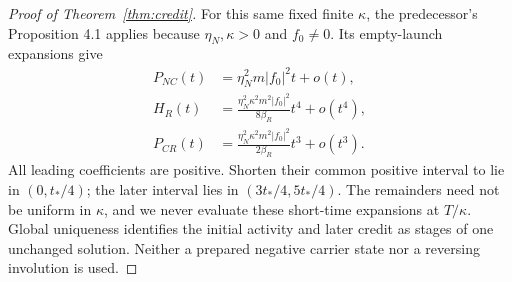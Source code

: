 \begin{proof}[Proof of Theorem~\ref{thm:credit}]
For this same fixed finite $\kappa$, the predecessor's Proposition 4.1 applies because $\eta_N,\kappa>0$ and $f_0\ne0$. Its empty-launch expansions give
\begin{equation}\label{eq:initialactivity}
\begin{aligned}
P_{NC}(t)&=\eta_N^2m|f_0|^2t+o(t),\\
H_R(t)&=\frac{\eta_N^2\kappa^2m^2|f_0|^2}{8\beta_R}t^4+o(t^4),\\
P_{CR}(t)&=\frac{\eta_N^2\kappa^2m^2|f_0|^2}{2\beta_R}t^3+o(t^3).
\end{aligned}
\end{equation}
All leading coefficients are positive. Shorten their common positive interval to lie in $(0,t_*/4)$; the later interval lies in
$(3t_*/4,5t_*/4)$. The remainders need not be uniform in $\kappa$, and we never evaluate these short-time expansions at $T/\kappa$. Global uniqueness identifies the initial activity and later credit as stages of one unchanged solution. Neither a prepared negative carrier state nor a reversing involution is used.
\end{proof}
